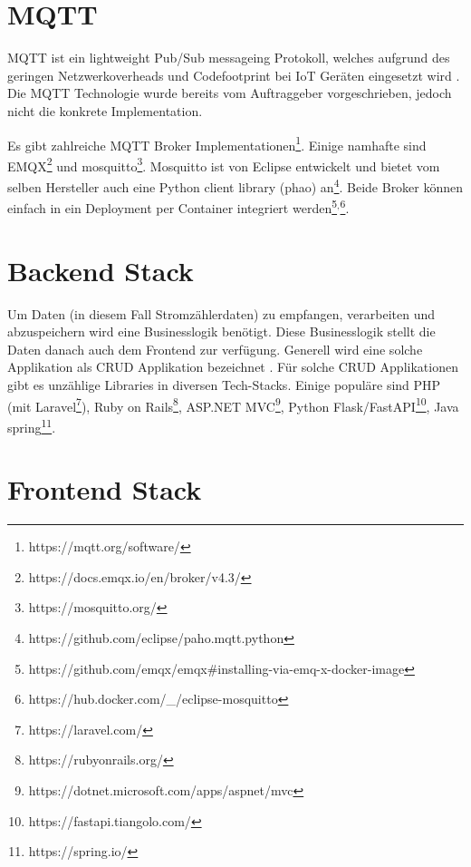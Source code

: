 
\section{MQTT} %
\label{state:mqtt}
\ac{MQTT} ist ein lightweight Pub/Sub messageing Protokoll, welches aufgrund des
geringen Netzwerkoverheads und Codefootprint bei \ac{IoT} Geräten eingesetzt wird \parencite{mqtt}.
Die \ac{MQTT} Technologie wurde bereits vom Auftraggeber vorgeschrieben, jedoch
nicht die konkrete Implementation.

Es gibt zahlreiche \ac{MQTT} Broker Implementationen\footnote{https://mqtt.org/software/}.
Einige namhafte sind EMQX\footnote{https://docs.emqx.io/en/broker/v4.3/} und mosquitto\footnote{https://mosquitto.org/}.
Mosquitto ist von Eclipse entwickelt und bietet vom selben Hersteller auch eine
Python client library (phao) an\footnote{https://github.com/eclipse/paho.mqtt.python}.
Beide Broker können einfach in ein Deployment per Container integriert werden\footnote{https://github.com/emqx/emqx\#installing-via-emq-x-docker-image}$^{,}$\footnote{https://hub.docker.com/\_/eclipse-mosquitto}.

\section{Backend Stack}
\label{state:backend}

Um Daten (in diesem Fall Stromzählerdaten) zu empfangen, verarbeiten und abzuspeichern
wird eine Businesslogik benötigt. Diese Businesslogik stellt die Daten
danach auch dem Frontend zur verfügung. Generell wird eine solche Applikation als \ac{CRUD} Applikation
bezeichnet \parencite{sulemani_2021} \parencite{johnston_2021}.
Für solche \ac{CRUD} Applikationen gibt es unzählige Libraries in diversen Tech-Stacks.
Einige populäre sind PHP (mit Laravel\footnote{https://laravel.com/}),
Ruby on Rails\footnote{https://rubyonrails.org/}, ASP.NET MVC\footnote{https://dotnet.microsoft.com/apps/aspnet/mvc},
Python Flask/FastAPI\footnote{https://fastapi.tiangolo.com/}, Java spring\footnote{https://spring.io/}.


\section{Frontend Stack}
\label{state:frontend}

